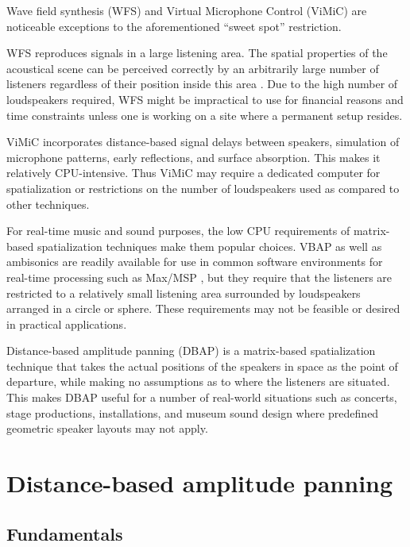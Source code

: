 \documentclass[twoside,10pt]{article}
\begin{document}
Wave field synthesis (WFS) and Virtual Microphone Control (ViMiC) \cite{Peters:2008vimic} are noticeable exceptions to the aforementioned ``sweet spot'' restriction.

WFS reproduces signals in a large listening area. The spatial properties of the acoustical scene can be perceived correctly by an arbitrarily large number of listeners regardless of their position inside this area \cite{Spors:2004sound_field_synthesis}. Due to the high number of loudspeakers required, WFS might be impractical to use for financial reasons and time constraints unless one is working on a site where a permanent setup resides.

ViMiC incorporates distance-based signal delays between speakers, simulation of microphone patterns, early reflections, and surface absorption. This makes it relatively CPU-intensive.  Thus ViMiC may require a dedicated computer for spatialization or restrictions on the number of loudspeakers used as compared to other techniques.

For real-time music and sound purposes, the low CPU requirements of matrix-based spatialization techniques make them popular choices. VBAP as well as ambisonics are readily available for use in common software environments for real-time processing such as Max/MSP \cite{Pulkki:2000vbap_max, Schacher:2006ambi_max, Neukom:2008ambipan}, but they require that the listeners are restricted to a relatively small listening area surrounded by loudspeakers arranged in a circle or sphere.  These requirements may not be feasible or desired in practical applications.  

Distance-based amplitude panning (DBAP) is a matrix-based spatialization technique that takes the actual positions of the speakers in space as the point of departure, while making no assumptions as to where the listeners are situated. This makes DBAP useful for a number of real-world situations such as concerts, stage productions, installations\cite{lossius:2008installations}, and museum sound design where predefined geometric speaker layouts may not apply.


%
%

\section{Distance-based amplitude panning}

\subsection{Fundamentals}
\end{document}
